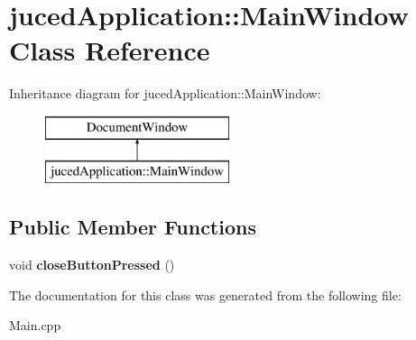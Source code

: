 \hypertarget{classjuced_application_1_1_main_window}{\section{juced\-Application\-:\-:Main\-Window Class Reference}
\label{classjuced_application_1_1_main_window}
}
Inheritance diagram for juced\-Application\-:\-:Main\-Window\-:\begin{figure}[H]
\begin{center}
\leavevmode
\includegraphics[height=2.000000cm]{classjuced_application_1_1_main_window}
\end{center}
\end{figure}
\subsection*{Public Member Functions}
\begin{DoxyCompactItemize}
\item 
\hypertarget{classjuced_application_1_1_main_window_aeeb894e5b022565b67601273d978d4cb}{void {\bfseries close\-Button\-Pressed} ()}\label{classjuced_application_1_1_main_window_aeeb894e5b022565b67601273d978d4cb}

\end{DoxyCompactItemize}


The documentation for this class was generated from the following file\-:\begin{DoxyCompactItemize}
\item 
Main.\-cpp\end{DoxyCompactItemize}
